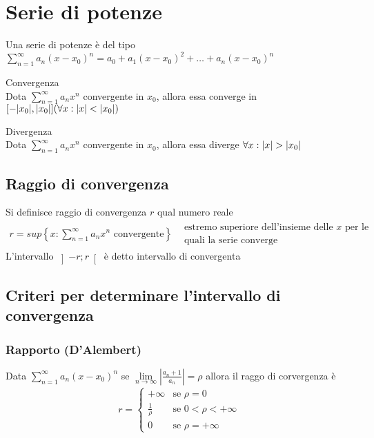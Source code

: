 \section{Serie di potenze}
Una serie di potenze è del tipo $\displaystyle\sum_{n=1}^\infty a_n(x-x_0)^n=a_0+a_1(x-x_0)^2+\dots + a_n(x-x_0)^n$
\begin{teorema}
  Convergenza\\
  Dota $\displaystyle\sum_{n=1}^\infty a_n x^n$ convergente in $x_0$, allora essa
  converge in $[-\lvert x_0\rvert,\lvert x_0\rvert](\forall x: \lvert x\rvert<\lvert x_0\rvert)$    
\end{teorema}
\begin{teorema}
  Divergenza\\
  Dota $\displaystyle\sum_{n=1}^\infty a_n x^n$ convergente in $x_0$, allora essa diverge
  $\forall x: \lvert x\rvert>\lvert x_0\rvert$
\end{teorema}
\subsection{Raggio di convergenza}
Si definisce raggio di convergenza $r$ qual numero reale
\begin{eqnarray*}
  r=sup \left\{x:\displaystyle\sum_{n=1}^\infty a_n x^n \text{ convergente} \right\}
  & \begin{matrix}
      \text{estremo superiore dell'insieme delle $x$ per le}\\
      \text{quali la serie converge}
    \end{matrix}
\end{eqnarray*}
L'intervallo $\left]-r;r\right[$ è detto {\color{red}intervallo di convergenta}
\clearpage
\subsection{Criteri per determinare l'intervallo di convergenza}
\subsubsection{Rapporto (D'Alembert)}
Data $\displaystyle\sum_{n=1}^\infty a_n(x-x_0)^n$ se
$\lim\limits_{n\to\infty}\left|\frac{a_n+1}{a_n}\right|=\rho$ allora il raggo di corvergenza è 
\begin{eqnarray*}
  r=\begin{cases}
      +\infty &\text{se } \rho=0\\
      \frac{1}{\rho} &\text{se } 0< \rho <+\infty\\
      0 & \text{se } \rho=+\infty
    \end{cases}
\end{eqnarray*}

